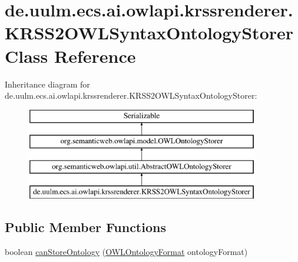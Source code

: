 \hypertarget{classde_1_1uulm_1_1ecs_1_1ai_1_1owlapi_1_1krssrenderer_1_1_k_r_s_s2_o_w_l_syntax_ontology_storer}{\section{de.\-uulm.\-ecs.\-ai.\-owlapi.\-krssrenderer.\-K\-R\-S\-S2\-O\-W\-L\-Syntax\-Ontology\-Storer Class Reference}
\label{classde_1_1uulm_1_1ecs_1_1ai_1_1owlapi_1_1krssrenderer_1_1_k_r_s_s2_o_w_l_syntax_ontology_storer}
}
Inheritance diagram for de.\-uulm.\-ecs.\-ai.\-owlapi.\-krssrenderer.\-K\-R\-S\-S2\-O\-W\-L\-Syntax\-Ontology\-Storer\-:\begin{figure}[H]
\begin{center}
\leavevmode
\includegraphics[height=4.000000cm]{classde_1_1uulm_1_1ecs_1_1ai_1_1owlapi_1_1krssrenderer_1_1_k_r_s_s2_o_w_l_syntax_ontology_storer}
\end{center}
\end{figure}
\subsection*{Public Member Functions}
\begin{DoxyCompactItemize}
\item 
boolean \hyperlink{classde_1_1uulm_1_1ecs_1_1ai_1_1owlapi_1_1krssrenderer_1_1_k_r_s_s2_o_w_l_syntax_ontology_storer_aeaadd9e304461b47d7c4f119330ea289}{can\-Store\-Ontology} (\hyperlink{classorg_1_1semanticweb_1_1owlapi_1_1model_1_1_o_w_l_ontology_format}{O\-W\-L\-Ontology\-Format} ontology\-Format)
\end{DoxyCompactItemize}
